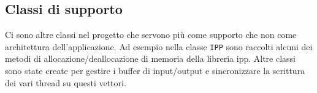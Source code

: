 \subsection{Classi di supporto}
Ci sono altre classi nel progetto che servono pi\`u come supporto che non come
architettura dell'applicazione. Ad esempio nella classe \texttt{IPP} sono
raccolti alcuni dei metodi di allocazione/deallocazione di memoria della
libreria \ac{ipp}. Altre classi sono state create per gestire i buffer di
input/output e sincronizzare la scrittura dei vari thread su questi vettori.
